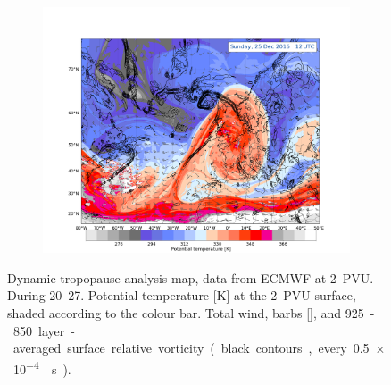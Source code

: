 \begin{figure}
    \begin{subfigure}[b]{\textwidth}
        \includegraphics[trim={4.2cm 0cm 4.3cm 36.8cm},clip,
        width=\textwidth]{./fig_DynTropo/20161225_12}
    \end{subfigure}
    \caption{Dynamic tropopause analysis map, data from ECMWF at \SI{2}{PVU}. During \SIrange{20}{27}{\dec}. Potential temperature [K] at the \SI{2}{PVU} surface, shaded according to the colour bar. Total wind, barbs [\SI{}{\mPs}], and \SI{925}-\SI{850}{\hPa} layer-averaged surface relative vorticity (black contours, every \SI{.5e-4}{\per\second}).  }\label{fig:DynTropo}
\end{figure}